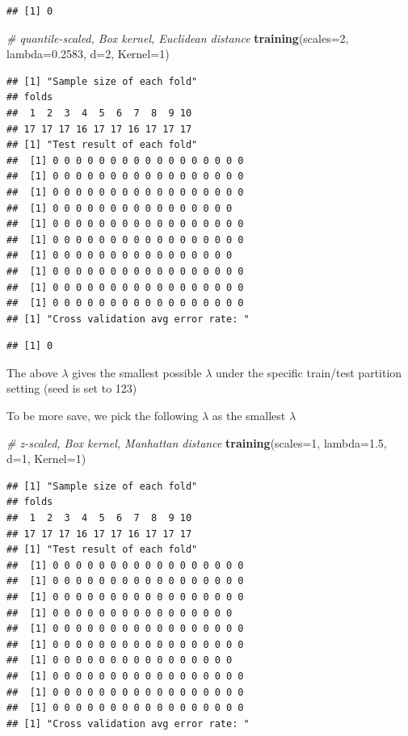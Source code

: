 \documentclass[12pt]{article}
\newenvironment{Shaded}{\begin{snugshade}}{\end{snugshade}}
\newcommand{\AttributeTok}[1]{\textcolor[rgb]{0.13,0.29,0.53}{#1}}
\newcommand{\CommentTok}[1]{\textcolor[rgb]{0.56,0.35,0.01}{\textit{#1}}}
\newcommand{\DecValTok}[1]{\textcolor[rgb]{0.00,0.00,0.81}{#1}}
\newcommand{\FloatTok}[1]{\textcolor[rgb]{0.00,0.00,0.81}{#1}}
\newcommand{\FunctionTok}[1]{\textcolor[rgb]{0.13,0.29,0.53}{\textbf{#1}}}
\newcommand{\NormalTok}[1]{#1}
\begin{document}
\begin{verbatim}
## [1] 0
\end{verbatim}

\begin{Shaded}
\begin{Highlighting}[]
\CommentTok{\# quantile{-}scaled, Box kernel, Euclidean distance}
\FunctionTok{training}\NormalTok{(}\AttributeTok{scales=}\DecValTok{2}\NormalTok{, }\AttributeTok{lambda=}\FloatTok{0.2583}\NormalTok{, }\AttributeTok{d=}\DecValTok{2}\NormalTok{, }\AttributeTok{Kernel=}\DecValTok{1}\NormalTok{)}
\end{Highlighting}
\end{Shaded}

\begin{verbatim}
## [1] "Sample size of each fold"
## folds
##  1  2  3  4  5  6  7  8  9 10 
## 17 17 17 16 17 17 16 17 17 17 
## [1] "Test result of each fold"
##  [1] 0 0 0 0 0 0 0 0 0 0 0 0 0 0 0 0 0
##  [1] 0 0 0 0 0 0 0 0 0 0 0 0 0 0 0 0 0
##  [1] 0 0 0 0 0 0 0 0 0 0 0 0 0 0 0 0 0
##  [1] 0 0 0 0 0 0 0 0 0 0 0 0 0 0 0 0
##  [1] 0 0 0 0 0 0 0 0 0 0 0 0 0 0 0 0 0
##  [1] 0 0 0 0 0 0 0 0 0 0 0 0 0 0 0 0 0
##  [1] 0 0 0 0 0 0 0 0 0 0 0 0 0 0 0 0
##  [1] 0 0 0 0 0 0 0 0 0 0 0 0 0 0 0 0 0
##  [1] 0 0 0 0 0 0 0 0 0 0 0 0 0 0 0 0 0
##  [1] 0 0 0 0 0 0 0 0 0 0 0 0 0 0 0 0 0
## [1] "Cross validation avg error rate: "
\end{verbatim}

\begin{verbatim}
## [1] 0
\end{verbatim}

The above \(\lambda\) gives the smallest possible \(\lambda\) under the
specific train/test partition setting (seed is set to 123)

To be more save, we pick the following \(\lambda\) as the smallest
\(\lambda\)

\begin{Shaded}
\begin{Highlighting}[]
\CommentTok{\# z{-}scaled, Box kernel, Manhattan distance}
\FunctionTok{training}\NormalTok{(}\AttributeTok{scales=}\DecValTok{1}\NormalTok{, }\AttributeTok{lambda=}\FloatTok{1.5}\NormalTok{, }\AttributeTok{d=}\DecValTok{1}\NormalTok{, }\AttributeTok{Kernel=}\DecValTok{1}\NormalTok{)}
\end{Highlighting}
\end{Shaded}

\begin{verbatim}
## [1] "Sample size of each fold"
## folds
##  1  2  3  4  5  6  7  8  9 10 
## 17 17 17 16 17 17 16 17 17 17 
## [1] "Test result of each fold"
##  [1] 0 0 0 0 0 0 0 0 0 0 0 0 0 0 0 0 0
##  [1] 0 0 0 0 0 0 0 0 0 0 0 0 0 0 0 0 0
##  [1] 0 0 0 0 0 0 0 0 0 0 0 0 0 0 0 0 0
##  [1] 0 0 0 0 0 0 0 0 0 0 0 0 0 0 0 0
##  [1] 0 0 0 0 0 0 0 0 0 0 0 0 0 0 0 0 0
##  [1] 0 0 0 0 0 0 0 0 0 0 0 0 0 0 0 0 0
##  [1] 0 0 0 0 0 0 0 0 0 0 0 0 0 0 0 0
##  [1] 0 0 0 0 0 0 0 0 0 0 0 0 0 0 0 0 0
##  [1] 0 0 0 0 0 0 0 0 0 0 0 0 0 0 0 0 0
##  [1] 0 0 0 0 0 0 0 0 0 0 0 0 0 0 0 0 0
## [1] "Cross validation avg error rate: "
\end{verbatim}
\end{document}
